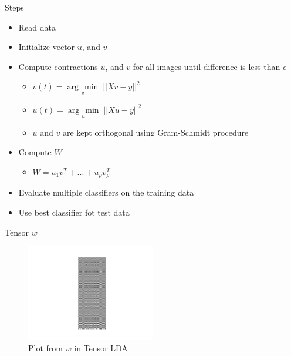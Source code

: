 \documentclass[handout]{beamer}
\newcommand{\argmin}[1]{\underset{#1}{\operatorname{arg}\,\operatorname{min}}\;}
\begin{document}
\begin{frame}{Steps}
    \begin{itemize}
        \item Read data
        \item Initialize vector $u$, and $v$
        \item Compute contractions $u$, and $v$ for all images until difference is less than $\epsilon$
            \begin{itemize}
                \item $v(t) = \argmin{v} ||Xv-y||^2$ 
                \item $u(t) = \argmin{u} ||Xu-y||^2$ 
                \item $u$ and $v$ are kept orthogonal using Gram-Schmidt procedure
            \end{itemize}
        \item Compute $W$
            \begin{itemize}
                \item $W = u_1v^T_1 + ... + u_\rho v_\rho^T$ 
            \end{itemize}
        \item Evaluate multiple classifiers on the training data
        \item Use best classifier fot test data
    \end{itemize}
\end{frame}
\note{}

\begin{frame}{Tensor $w$}
    {\centering
    \begin{figure}[H]
        \includegraphics[width=0.50\textwidth]{project_03/tensor_w.png}
        \caption{Plot from $w$ in Tensor LDA}
    \end{figure}
    }
\end{frame}
\end{document}
